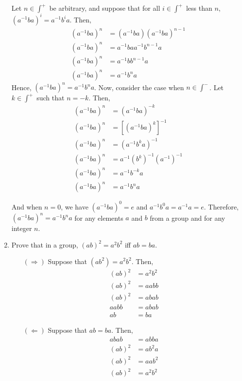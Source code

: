 \begin{example}[Seatwork]
\begin{enumerate}
            Let \(n\in \int^+\) be arbitrary, and suppose that for all \(i\in\int^+\) less than \(n\), \((a^{-1}ba)^{i} = a^{-1}b^i a\). Then,
            \begin{align*}
                (a^{-1}ba)^{n} &= (a^{-1}b a)(a^{-1}b a)^{n - 1} \\
                (a^{-1}ba)^{n} &= a^{-1}baa^{-1}b^{n - 1} a \\
                (a^{-1}ba)^{n} &= a^{-1}bb^{n - 1} a \\
                (a^{-1}ba)^{n} &= a^{-1}b^{n} a
            \end{align*}
            Hence, \((a^{-1}ba)^{n} = a^{-1}b^{n} a\). Now, consider the case when \(n\in\int^-\). Let \(k\in\int^+\) such that \(n = -k\). Then,
            \begin{align*}
                (a^{-1}ba)^{n} &= (a^{-1}ba)^{-k} \\
                (a^{-1}ba)^{n} &= \left[(a^{-1}ba)^k\right]^{-1} \\
                (a^{-1}ba)^{n} &= (a^{-1}b^ka)^{-1} \\
                (a^{-1}ba)^{n} &= a^{-1}(b^k)^{-1}(a^{-1})^{-1} \\
                (a^{-1}ba)^{n} &= a^{-1}b^{-k}a \\
                (a^{-1}ba)^{n} &= a^{-1}b^{n}a
            \end{align*}

            And when \(n = 0\), we have \((a^{-1}ba)^{0} = e\) and \(a^{-1}b^0a = a^{-1}a = e\). Therefore, \((a^{-1}ba)^{n} = a^{-1}b^n a\) for any elements \(a\) and \(b\) from a group and for any integer \(n\).

            \item Prove that in a group, \((ab)^2 = a^2b^2\) iff \(ab = ba\).
            \begin{itemize}
                \item[\((\Rightarrow)\)] Suppose that \((ab^2) = a^2b^2\). Then,
                \begin{align*}
                    (ab)^2 &= a^2b^2 \\
                    (ab)^2 &= aabb \\
                    (ab)^2 &= abab \\
                    aabb &= abab \\
                    ab &= ba
                \end{align*}

                \item[\((\Leftarrow)\)] Suppose that \(ab = ba\). Then,
                \begin{align*}
                    abab &= abba \\
                    (ab)^2 &= ab^2a \\
                    (ab)^2 &= aab^2 \\
                    (ab)^2 &= a^2b^2
                \end{align*}


\end{itemize}
\end{enumerate}
\end{example}
